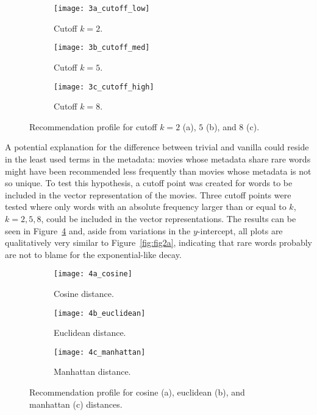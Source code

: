 \begin{figure}
  \centering
  \begin{subfigure}{0.3\textwidth}
    \centering
    \texttt{[image: 3a\_cutoff\_low]}
    \caption{Cutoff $k = 2$.\label{fig:fig3a}}
  \end{subfigure}
  \begin{subfigure}{0.3\textwidth}
    \centering
    \texttt{[image: 3b\_cutoff\_med]}
    \caption{Cutoff $k = 5$.\label{fig:fig3b}}
  \end{subfigure}
  \begin{subfigure}{0.3\textwidth}
    \centering
    \texttt{[image: 3c\_cutoff\_high]}
    \caption{Cutoff $k = 8$.\label{fig:fig3c}}
  \end{subfigure}
  \caption{Recommendation profile for cutoff $k = 2$ (a), $5$ (b), and $8$
    (c).\label{fig:fig3}}
\end{figure}


A potential explanation for the difference between trivial and vanilla could
reside in the least used terms in the metadata: movies whose metadata share rare
words might have been recommended less frequently than movies whose metadata is
not so unique. To test this hypothesis, a cutoff point was created for words to
be included in the vector representation of the movies. Three cutoff points were
tested where only words with an absolute frequency larger than or equal to $k$,
$k = {2, 5, 8}$, could be included in the vector representations. The results
can be seen in Figure~\ref{fig:fig3} and, aside from variations in the
$y$-intercept, all plots are qualitatively very similar to
Figure~\ref{fig:fig2a}, indicating that rare words probably are not to blame for
the exponential-like decay.

\begin{figure}
  \centering
  \begin{subfigure}{0.3\textwidth}
    \centering
    \texttt{[image: 4a\_cosine]}
    \caption{Cosine distance.\label{fig:fig4a}}
  \end{subfigure}
  \begin{subfigure}{0.3\textwidth}
    \centering
    \texttt{[image: 4b\_euclidean]}
    \caption{Euclidean distance.\label{fig:fig4b}}
  \end{subfigure}
  \begin{subfigure}{0.3\textwidth}
    \centering
    \texttt{[image: 4c\_manhattan]}
    \caption{Manhattan distance.\label{fig:fig4c}}
  \end{subfigure}
  \caption{Recommendation profile for cosine (a), euclidean (b), and manhattan
    (c) distances.\label{fig:fig4}}
\end{figure}

